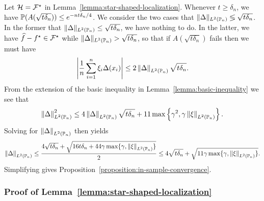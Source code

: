 Let $\mc{H} = \mc{F}\opt$ in Lemma~\ref{lemma:star-shaped-localization}.
Whenever $t \ge \delta_n$, we have
$\P(A(\sqrt{t \delta_n})) \le e^{-nt \delta_n / 4}$. We consider the two
cases that $\LtwoPns{\Delta} \lessgtr \sqrt{t \delta_n}$. In the
former that $\LtwoPns{\Delta} \le \sqrt{t \delta_n}$, we have
nothing to do. In the latter, we have $\what{f} - f\opt \in \mc{F}\opt$
while $\LtwoPns{\Delta} > \sqrt{t \delta_n}$, so that if
$A(\sqrt{t \delta_n})$ fails then we must have
\begin{equation*}
  \left|\frac{1}{n} \sum_{i = 1}^n \noise_i \Delta(x_i)\right|
  \le 2 \LtwoPn{\Delta} \sqrt{t \delta_n}.
\end{equation*}
From the extension of the basic inequality in
Lemma~\ref{lemma:basic-inequality} we see that
\begin{equation*}
  \LtwoPn{\Delta}^2 \le 
  4 \LtwoPn{\Delta} \sqrt{t \delta_n} +
  11 \max\left\{\gamma^2, \gamma \LtwoPn{\noise}\right\}.
\end{equation*}
Solving for $\LtwoPn{\Delta}$ then yields
\begin{equation*}
  \LtwoPn{\Delta}
  \le \frac{4 \sqrt{t \delta_n} + \sqrt{16 t \delta_n
      + 44 \gamma \max\{\gamma, \LtwoPn{\noise}\}}}{2}
  \le 4 \sqrt{t \delta_n} +
  \sqrt{11 \gamma \max\{\gamma, \LtwoPn{\noise}\}}.
\end{equation*}
Simplifying gives Proposition~\ref{proposition:in-sample-convergence}.

\subsubsection{Proof of Lemma~\ref{lemma:star-shaped-localization}}
\label{sec:proof-star-shaped-localization}

